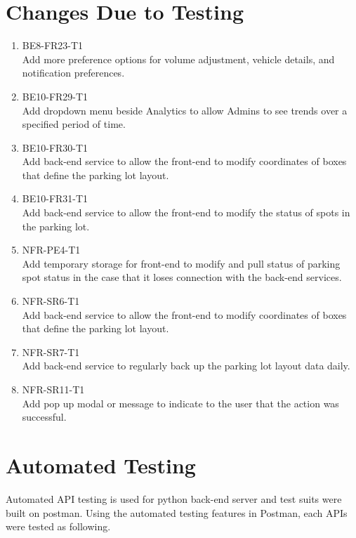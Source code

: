 \documentclass[12pt, titlepage]{article}
\begin{document}
\section{Changes Due to Testing}
\begin{enumerate}
    \item BE8-FR23-T1\\
    Add more preference options for volume adjustment, vehicle details, and
    notification preferences.
    \item BE10-FR29-T1\\
    Add dropdown menu beside Analytics to allow Admins to see trends over a
    specified period of time.
    \item BE10-FR30-T1\\
    Add back-end service to allow the front-end to modify coordinates of boxes
    that define the parking lot layout.
    \item BE10-FR31-T1\\
    Add back-end service to allow the front-end to modify the status of spots in
    the parking lot.
    \item NFR-PE4-T1\\
    Add temporary storage for front-end to modify and pull status of parking
    spot status in the case that it loses connection with the back-end services.
    \item NFR-SR6-T1\\
    Add back-end service to allow the front-end to modify coordinates of boxes
    that define the parking lot layout.
    \item NFR-SR7-T1\\
    Add back-end service to regularly back up the parking lot layout data daily.
    \item NFR-SR11-T1\\
    Add pop up modal or message to indicate to the user that the action was
    successful.
\end{enumerate}

\section{Automated Testing}

Automated API testing is used for python back-end server and test suits were
built on postman. Using the automated testing features in Postman, each APIs
were tested as following.
\end{document}
